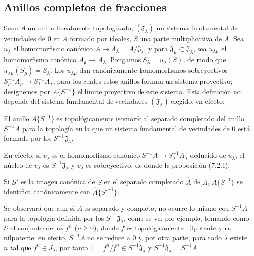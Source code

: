 \subsection{Anillos completos de fracciones}
\label{subsection:0.7.6-fr}

\begin{env}[7.6.1]
\label{0.7.6.1-fr}
Sean $A$ un anillo linealmente topologizado, $(\mathfrak J_\lambda)$ un
sistema fundamental de vecindades de 0 en $A$ formado por ideales, $S$ una parte
multiplicativa de $A$. Sea $u_\lambda$ el homomorfismo canónico
$A\to A_\lambda=A/\mathfrak J_\lambda$, y para
$\mathfrak J_\mu\subset\mathfrak J_\lambda$, sea $u_{\lambda\mu}$
el homomorfismo canónico $A_\mu\to A_\lambda$. Pongamos
$S_\lambda=u_\lambda(S)$, de modo que
$u_{\lambda\mu}(S_\mu)=S_\lambda$. Los $u_{\lambda\mu}$ dan
canónicamente homomorfismos sobreyectivos
$S_\mu^{-1}A_\mu\to S_\lambda^{-1}A_\lambda$, para los cuales estos anillos
forman un sistema proyectivo; designemos por $A\{S^{-1}\}$ el límite
proyectivo de este sistema. Esta definición no depende del sistema fundamental
de vecindades $(\mathfrak J_\lambda)$ elegido; en efecto:
\end{env}

\begin{proposition}[7.6.2]
\label{0.7.6.2-fr}
El anillo $A\{S^{-1}\}$ es topológicamente isomorfo al separado completado del
anillo $S^{-1}A$ para la topología en la que un sistema fundamental de vecindades
de 0 está formado por los $S^{-1}\mathfrak J_\lambda$.
\end{proposition}

En efecto, si $v_\lambda$ es el homomorfismo canónico
$S^{-1}A\to S_\lambda^{-1}A_\lambda$ deducido de $u_\lambda$, el núcleo de
$v_\lambda$ es $S^{-1}\mathfrak J_\lambda$ y $v_\lambda$ es sobreyectivo,
de donde la proposición (7.2.1).

\begin{corollary}[7.6.3]
\label{0.7.6.3-fr}
Si $S'$ es la imagen canónica de $S$ en el separado completado $\widehat A$ de
$A$, $A\{S^{-1}\}$ se identifica canónicamente con
$\widehat A\{{S'}^{-1}\}$.
\end{corollary}

Se observará que aun si $A$ es separado y completo, no ocurre lo mismo con
$S^{-1}A$ para la topología definida por los
$S^{-1}\mathfrak J_\lambda$, como se ve, por ejemplo, tomando como $S$
el conjunto de los $f^n$ ($n\geq0$), donde $f$ es topológicamente nilpotente y no
nilpotente: en efecto, $S^{-1}A$ no se reduce a 0 y, por otra parte, para todo
$\lambda$ existe $n$ tal que $f^n\in J_\lambda$, por tanto
$1=f^n/f^n\in S^{-1}\mathfrak J_\lambda$ y
$S^{-1}\mathfrak J_\lambda=S^{-1}A$.

